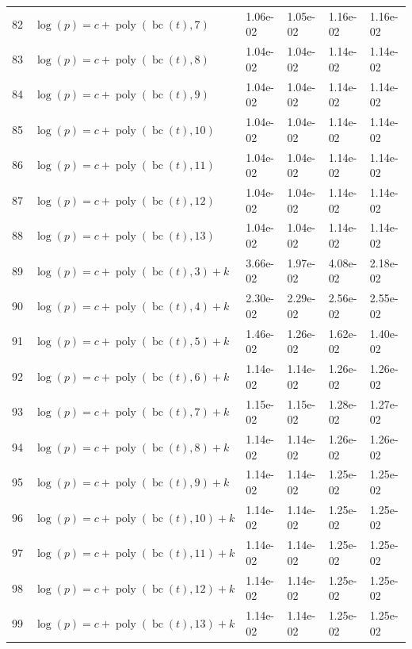 \documentclass[12pt,a4paper]{article}
\DeclareMathOperator{\bc}{bc}
\DeclareMathOperator{\poly}{poly}
\begin{document}
\begin{longtable}[t]{ll>{\raggedleft\arraybackslash}p{2cm}>{\raggedleft\arraybackslash}p{2cm}>{\raggedleft\arraybackslash}p{2cm}>{\raggedleft\arraybackslash}p{2cm}}
82 & $\log(p) = c + \poly\left( \bc(t), 7 \right)$ & 1.06e-02 & 1.05e-02 & 1.16e-02 & 1.16e-02\\
\rowcolor{gray!6}  83 & $\log(p) = c + \poly\left( \bc(t), 8 \right)$ & 1.04e-02 & 1.04e-02 & 1.14e-02 & 1.14e-02\\
84 & $\log(p) = c + \poly\left( \bc(t), 9 \right)$ & 1.04e-02 & 1.04e-02 & 1.14e-02 & 1.14e-02\\
\rowcolor{gray!6}  85 & $\log(p) = c + \poly\left( \bc(t), 10 \right)$ & 1.04e-02 & 1.04e-02 & 1.14e-02 & 1.14e-02\\
86 & $\log(p) = c + \poly\left( \bc(t), 11 \right)$ & 1.04e-02 & 1.04e-02 & 1.14e-02 & 1.14e-02\\
\rowcolor{gray!6}  87 & $\log(p) = c + \poly\left( \bc(t), 12 \right)$ & 1.04e-02 & 1.04e-02 & 1.14e-02 & 1.14e-02\\
88 & $\log(p) = c + \poly\left( \bc(t), 13 \right)$ & 1.04e-02 & 1.04e-02 & 1.14e-02 & 1.14e-02\\
\rowcolor{gray!6}  89 & $\log(p) = c + \poly\left( \bc(t), 3 \right) + k$ & 3.66e-02 & 1.97e-02 & 4.08e-02 & 2.18e-02\\
90 & $\log(p) = c + \poly\left( \bc(t), 4 \right) + k$ & 2.30e-02 & 2.29e-02 & 2.56e-02 & 2.55e-02\\
\rowcolor{gray!6}  91 & $\log(p) = c + \poly\left( \bc(t), 5 \right) + k$ & 1.46e-02 & 1.26e-02 & 1.62e-02 & 1.40e-02\\
92 & $\log(p) = c + \poly\left( \bc(t), 6 \right) + k$ & 1.14e-02 & 1.14e-02 & 1.26e-02 & 1.26e-02\\
\rowcolor{gray!6}  93 & $\log(p) = c + \poly\left( \bc(t), 7 \right) + k$ & 1.15e-02 & 1.15e-02 & 1.28e-02 & 1.27e-02\\
94 & $\log(p) = c + \poly\left( \bc(t), 8 \right) + k$ & 1.14e-02 & 1.14e-02 & 1.26e-02 & 1.26e-02\\
\rowcolor{gray!6}  95 & $\log(p) = c + \poly\left( \bc(t), 9 \right) + k$ & 1.14e-02 & 1.14e-02 & 1.25e-02 & 1.25e-02\\
96 & $\log(p) = c + \poly\left( \bc(t), 10 \right) + k$ & 1.14e-02 & 1.14e-02 & 1.25e-02 & 1.25e-02\\
\rowcolor{gray!6}  97 & $\log(p) = c + \poly\left( \bc(t), 11 \right) + k$ & 1.14e-02 & 1.14e-02 & 1.25e-02 & 1.25e-02\\
98 & $\log(p) = c + \poly\left( \bc(t), 12 \right) + k$ & 1.14e-02 & 1.14e-02 & 1.25e-02 & 1.25e-02\\
\rowcolor{gray!6}  99 & $\log(p) = c + \poly\left( \bc(t), 13 \right) + k$ & 1.14e-02 & 1.14e-02 & 1.25e-02 & 1.25e-02\\

\end{longtable}
\end{document}
